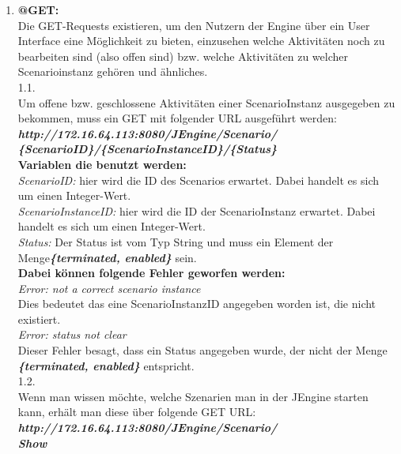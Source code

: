 \documentclass{acm_proc_article-sp}
\begin{document}
\begin{enumerate}
\item \textbf{@GET:}\\
Die GET-Requests existieren, um den Nutzern der Engine über ein User Interface eine Möglichkeit zu bieten, einzusehen welche Aktivitäten noch zu bearbeiten sind (also offen sind) bzw. welche Aktivitäten zu welcher Scenarioinstanz gehören und ähnliches. \\

1.1.\\ Um offene bzw. geschlossene Aktivitäten einer ScenarioInstanz ausgegeben zu bekommen, muss ein GET mit folgender URL ausgeführt werden:\\
\textbf{\textit{http://172.16.64.113:8080/JEngine/Scenario/\\\{ScenarioID\}/\{ScenarioInstanceID\}/\{Status\}}}\\

\textbf{Variablen die benutzt werden:}\\
\textit{ScenarioID:} hier wird die ID des Scenarios erwartet. Dabei handelt es sich um einen Integer-Wert.\\
\textit{ScenarioInstanceID:} hier wird die ID der ScenarioInstanz erwartet. Dabei handelt es sich um einen Integer-Wert.\\
\textit{Status:} Der Status ist vom Typ String und muss ein Element der Menge\textbf{\textit{\{terminated, enabled\}}} sein.\\

\textbf{Dabei können folgende Fehler geworfen werden:}\\
\textit{Error: not a correct scenario instance}\\ Dies bedeutet das eine ScenarioInstanzID angegeben worden ist, die nicht existiert.\\
\textit{Error: status not clear}\\ Dieser Fehler besagt, dass ein Status angegeben wurde, der nicht der Menge \textbf{\textit{\{terminated, enabled\}}} entspricht.\\

1.2. \\Wenn man wissen möchte, welche Szenarien man in der JEngine starten kann, erhält man diese über folgende GET URL:\\
\textbf{\textit{http://172.16.64.113:8080/JEngine/Scenario/\\Show}}\\


\end{enumerate}
\end{document}
